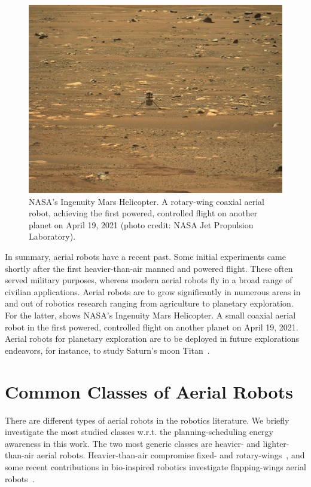 \begin{figure}[t]
  \centering
  \includegraphics[width=.7\textwidth]{pictures/jpegPIA24550}
  \caption[NASA's Ingenuity Mars Helicopter]{NASA's Ingenuity Mars Helicopter. A rotary-wing coaxial aerial robot, achieving the first powered, controlled flight on another planet on April 19, 2021 {\scriptsize(photo credit: NASA Jet Propulsion Laboratory)}.}   
  \label{fig:ingenuity}
\end{figure}
In summary, aerial robots have a recent past. Some initial experiments came shortly after the first heavier-than-air manned and powered flight. These often served military purposes, whereas modern aerial robots fly in a broad range of civilian applications. Aerial robots are to grow significantly in numerous areas in and out of robotics research ranging from agriculture to planetary exploration. For the latter,  shows NASA's Ingenuity Mars Helicopter. A small coaxial aerial robot in the first powered, controlled flight on another planet on April 19, 2021. Aerial robots for planetary exploration are to be deployed in future explorations endeavors, for instance, to study Saturn's moon Titan~\citep{voosen2019nasa}.


\section{Common Classes of Aerial Robots}
\label{sec:aerial-robo-types}

There are different types of aerial robots in the robotics literature. We briefly investigate the most studied classes w.r.t. the planning-scheduling energy awareness in this work. The two most generic classes are heavier- and lighter-than-air aerial robots. Heavier-than-air compromise fixed- and rotary-wings~\citep{siciliano2016springer}, and some recent contributions in bio-inspired robotics investigate flapping-wings aerial robots~\citep{floreano2015science}.


